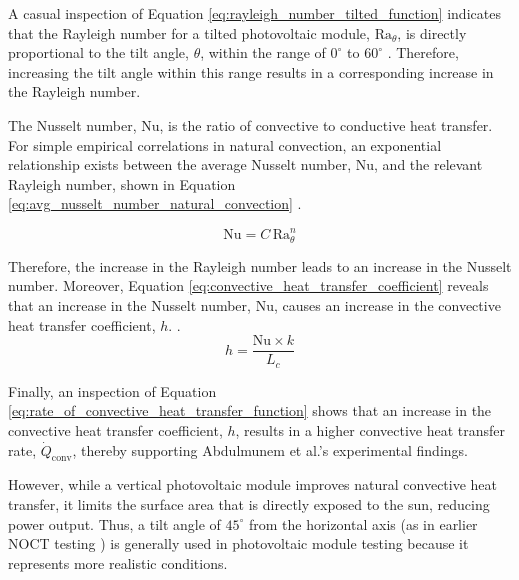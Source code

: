 A casual inspection of Equation \ref{eq:rayleigh_number_tilted_function} indicates that the Rayleigh number for a tilted photovoltaic module, $\text{Ra}_\theta$, is directly proportional to the tilt angle, $\theta$, within the range of $0^\circ$ to $60^\circ$ \cite{Cengel2014NaturalConvection}. Therefore, increasing the tilt angle within this range results in a corresponding increase in the Rayleigh number.\vspace{0.5em}

The Nusselt number, $\text{Nu}$, is the ratio of convective to conductive heat transfer. \cite{Basu2019MassMeter} For simple empirical correlations in natural convection, an exponential relationship exists between the average Nusselt number, $\text{Nu}$, and the relevant Rayleigh number, shown in Equation \ref{eq:avg_nusselt_number_natural_convection} \cite{Cengel2014NaturalConvection}.

\begin{equation}
    \text{Nu} = C\,\text{Ra}_\theta^n
    \label{eq:avg_nusselt_number_natural_convection}
\end{equation}

Therefore, the increase in the Rayleigh number leads to an increase in the Nusselt number. Moreover, Equation \ref{eq:convective_heat_transfer_coefficient} reveals that an increase in the Nusselt number, $\text{Nu}$, causes an increase in the convective heat transfer coefficient, $h$. \cite{Cengel2014NaturalConvection}.
\begin{equation}
    h = \frac{\text{Nu} \times k}{L_c}
    \label{eq:convective_heat_transfer_coefficient}
\end{equation}

Finally, an inspection of Equation \ref{eq:rate_of_convective_heat_transfer_function} shows that an increase in the convective heat transfer coefficient, $h$, results in a higher convective heat transfer rate, $\dot{Q}_\text{conv}$, thereby supporting Abdulmunem et al.'s experimental findings.\vspace{0.5em}

However, while a vertical photovoltaic module improves natural convective heat transfer, it limits the surface area that is directly exposed to the sun, reducing power output. Thus, a tilt angle of $45^\circ$ from the horizontal axis (as in earlier NOCT testing \cite{InternationalElectrotechnicalCommission2005IECApproval}) is generally used in photovoltaic module testing because it represents more realistic conditions.\vspace{0.5em}

